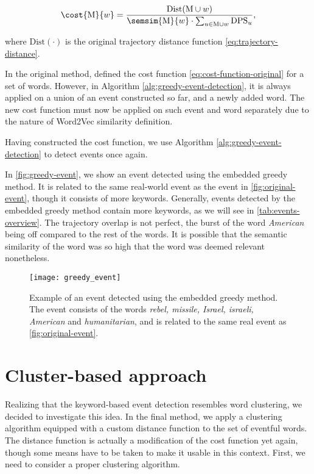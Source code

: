\begin{equation} \label{eq:cost-function}
	\cost{\featset}{w} = \frac{\text{Dist}( \featset \cup w )}{\semsim{\featset}{w} \cdot \sum_{u \in \featset \cup w}{\text{DPS}_{u}}},
\end{equation}

where $\text{Dist}(\cdot)$ is the original trajectory distance function \eqref{eq:trajectory-distance}.

In the original method, \cite{event-detection} defined the cost function \eqref{eq:cost-function-original} for a set of words. However, in Algorithm \ref{alg:greedy-event-detection}, it is always applied on a union of an event constructed so far, and a newly added word. The new cost function must now be applied on such event and word separately due to the nature of Word2Vec similarity definition.

Having constructed the cost function, we use Algorithm \ref{alg:greedy-event-detection} to detect events once again.

In \autoref{fig:greedy-event}, we show an event detected using the embedded greedy method. It is related to the same real-world event as the event in \autoref{fig:original-event}, though it consists of more keywords. Generally, events detected by the embedded greedy method contain more keywords, as we will see in \autoref{tab:events-overview}. The trajectory overlap is not perfect, the burst of the word \textit{American} being off compared to the rest of the words. It is possible that the semantic similarity of the word was so high that the word was deemed relevant nonetheless.

\begin{figure}
  \centering
  \texttt{[image: greedy\_event]}  %
  \caption{Example of an event detected using the embedded greedy method. The event consists of the words \textit{rebel, missile, Israel, israeli, American} and \textit{humanitarian}, and is related to the same real event as \autoref{fig:original-event}.}
  \label{fig:greedy-event}
\end{figure}


\section{Cluster-based approach}
Realizing that the keyword-based event detection resembles word clustering, we decided to investigate this idea. In the final method, we apply a clustering algorithm equipped with a custom distance function to the set of eventful words. The distance function is actually a modification of the cost function yet again, though some means have to be taken to make it usable in this context. First, we need to consider a proper clustering algorithm.

